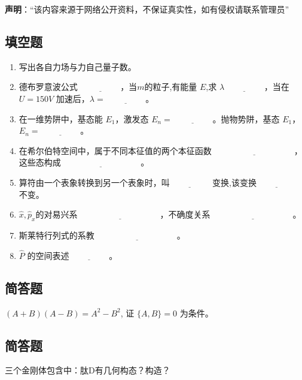 
\textbf{声明}：“该内容来源于网络公开资料，不保证真实性，如有侵权请联系管理员”

\subsection{填空题}
\begin{enumerate}
    \item 写出各自力场与力自己量子数。
    \item 德布罗意波公式 $\underline{\hspace{2cm}}$，当$m$的粒子,有能量 $E$,求 $\lambda\underline{\hspace{2cm}}$，当在 $U = 150V$ 加速后，$\lambda = \underline{\hspace{2cm}}$。
    \item 在一维势阱中，基态能 $E_1$，激发态 $E_n = \underline{\hspace{2cm}}$。抛物势阱，基态 $E_1$，$E_n = \underline{\hspace{2cm}}$。
    \item 在希尔伯特空间中，属于不同本征值的两个本征函数 $\underline{\hspace{4cm}}$，这些态构成$\underline{\hspace{4cm}}$。
    \item 算符由一个表象转换到另一个表象时，叫$\underline{\hspace{2cm}}$ 变换,该变换$\underline{\hspace{2cm}}$ 不变。
    \item $\hat x,\hat p_x$的对易兴系 $\underline{\hspace{4cm}}$，不确度关系 $\underline{\hspace{4cm}}$。
    \item 斯莱特行列式的系教 $\underline{\hspace{4cm}}$。
    \item $\hat P$ 的空间表述$\underline{\hspace{2cm}}$。
\end{enumerate}
\subsection{简答题}
 $(A+B)(A-B) = A^2 - B^2$, 证 $\{A, B\} = 0$ 为条件。
\subsection{简答题}
三个金刚体包含中：肽D有几何构态？构造？